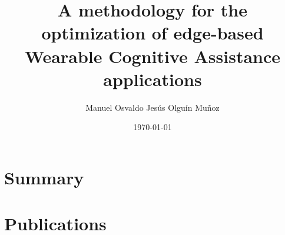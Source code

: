 \documentclass[electronic,oldfontcommands]{kthesis}
\begin{document}
\title{A methodology for the optimization of edge-based Wearable Cognitive Assistance applications}
\subtitle{{}}
\author{Manuel {Osvaldo Jesús} {Olguín Muñoz}}
\date{\today}
\address{%
	KTH Royal Institute of Technology\\%
	School of Electrical Engineering and Computer Science\\%
	Division of Information Science and Engineering\\%
	SE-10044 Stockholm\\%
	Sweden%
}

\maketitle

\frontmatter %






\mainmatter %

\tableofcontents*{}
\part{Summary}





\part{Publications}
\begin{appendices}
\ChNameVar{\rmfamily\Large}
\ChNumVar{\rmfamily\Huge\bfseries}
\ChTitleVar{\normalfont\rmfamily\Huge}
\renewcommand{\appendixname}{Paper}







\end{appendices}
\end{document}

